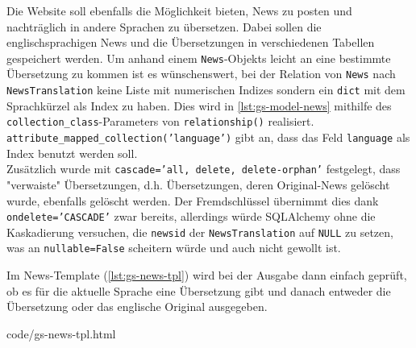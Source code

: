 Die Website soll ebenfalls die Möglichkeit bieten, News zu posten und
nachträglich in andere Sprachen zu übersetzen. Dabei sollen die
englischsprachigen News und die Übersetzungen in verschiedenen Tabellen
gespeichert werden. Um anhand einem \texttt{News}-Objekts leicht an eine
bestimmte Übersetzung zu kommen ist es wünschenswert, bei der Relation von
\texttt{News} nach \texttt{NewsTranslation} keine Liste mit numerischen Indizes
sondern ein \texttt{dict} mit dem Sprachkürzel als Index zu haben. Dies wird in
\autoref{lst:gs-model-news} mithilfe des \texttt{collection\_class}-Parameters
von \texttt{relationship()} realisiert. \\
\texttt{attribute\_mapped\_collection('language')} gibt an, dass das Feld
\texttt{language} als Index benutzt werden soll. \\
Zusätzlich wurde mit
\texttt{cascade='all, delete, delete-orphan'} festgelegt, dass "verwaiste"
Übersetzungen, d.h. Übersetzungen, deren Original-News gelöscht wurde, ebenfalls
gelöscht werden. Der Fremdschlüssel übernimmt dies dank
\texttt{ondelete='CASCADE'} zwar bereits, allerdings würde SQLAlchemy ohne
die Kaskadierung versuchen, die \texttt{newsid} der \texttt{NewsTranslation} auf
\texttt{NULL} zu setzen, was an \texttt{nullable=False} scheitern würde und auch
nicht gewollt ist.



Im News-Template (\autoref{lst:gs-news-tpl}) wird bei der Ausgabe dann einfach
geprüft, ob es für die aktuelle Sprache eine Übersetzung gibt und danach
entweder die Übersetzung oder das englische Original ausgegeben.


{code/gs-news-tpl.html}
